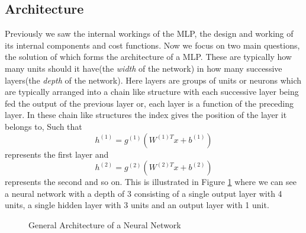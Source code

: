 \documentclass[14pt]{extarticle}
\numberwithin{equation}{section}
\begin{document}
		\subsection{Architecture}
		Previously we saw the internal workings of the MLP, the design and working of its internal components and cost functions. Now we focus on two main questions, the solution of which forms the architecture of a MLP. These are typically how many units should it have(the \textit{width} of the network) in how many successive layers(the \textit{depth} of the network). Here layers are groups of units or neurons which are typically arranged into a chain like structure with each successive layer being fed the output of the previous layer or, each layer is a function of the preceding layer. In these chain like structures the index gives the position of the layer it belongs to, Such that $$h^{(1)} = g^{(1)}(W^{(1)T}x + b^{(1)})$$ represents the first layer and $$h^{(2)} = g^{(2)}(W^{(2)T}x + b^{(2)})$$ represents the second\cite{Goodfellow-et-al-2016} and so on. This is illustrated in Figure \ref{nn_arch} where we can see a neural network with a depth of 3 consisting of a single output layer with 4 units, a single hidden layer with 3 units and an output layer with 1 unit.
			\begin{figure}[H]
			\centering
			\setlength{\fboxsep}{5pt}%
			\setlength{\fboxrule}{1pt}%
			\caption{General Architecture of a Neural Network
				\label{nn_arch}}
		\end{figure}
\end{document}

